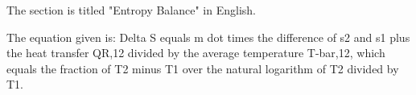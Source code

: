 The section is titled "Entropy Balance" in English.

The equation given is:
Delta S equals m dot times the difference of s2 and s1 plus the heat transfer QR,12 divided by the average temperature T-bar,12, which equals the fraction of T2 minus T1 over the natural logarithm of T2 divided by T1.